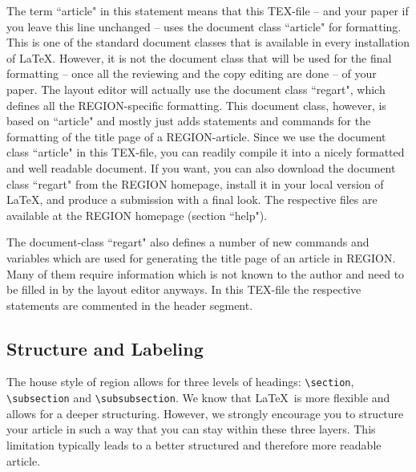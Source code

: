 \documentclass[a4paper,twoside]{article}
\begin{document}
The term ``article" in this statement means that this TEX-file -- and your paper if you leave this line unchanged -- uses the document class ``article" for formatting. This is one of the standard document classes that is available in every installation of \LaTeX. However, it is not the document class that will be used for the final formatting -- once all the reviewing and the copy editing are done -- of your paper. The layout editor will actually use the document class ``regart", which defines all the REGION-specific formatting. This document class, however, is based on ``article" and mostly just adds statements and commands for the formatting of the title page of a REGION-article. Since we use the document class ``article" in this TEX-file, you can readily compile it into a nicely formatted and well readable document. If you want, you can also download the document class ``regart" from the REGION homepage, install it in your local version of \LaTeX, and produce a submission with a final look. The respective files are available at the REGION homepage (section ``help").

The document-class ``regart" also defines a number of new commands and variables which are used for generating the title page of an article in REGION. Many of them require information which is not known to the author and need to be filled in by the layout editor anyways. In this TEX-file the respective statements are commented in the header segment.

\subsection{Structure and Labeling}
\label{sec:2.2}

The house style of region allows for three levels of headings: \verb|\section|, \verb|\subsection| and \verb|\subsubsection|. We know that \LaTeX\ is more flexible and allows for a deeper structuring. However, we strongly encourage you to structure your article in such a way that you can stay within these three layers. This limitation typically leads to a better structured and therefore more readable article.
\end{document}
